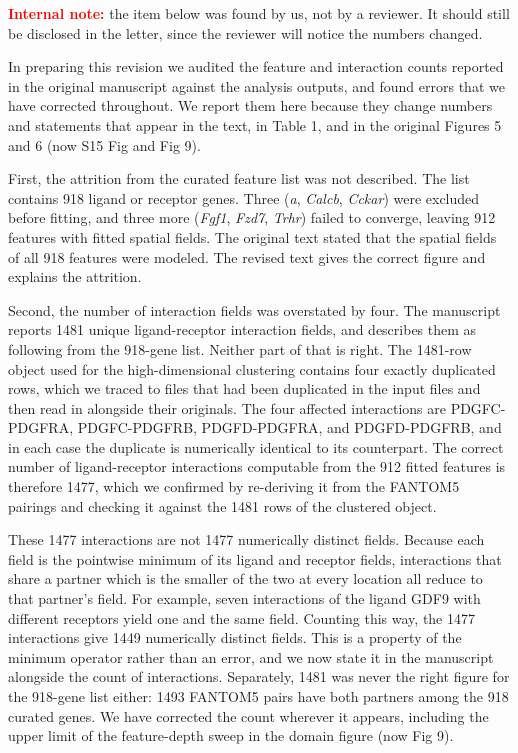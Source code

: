 \documentclass[11pt]{article}
\newif\ifdraftmode\draftmodetrue
\begin{document}
\ifdraftmode
\noindent\textcolor{red}{\textbf{Internal note:}} the item below was found by us, not by a
reviewer. It should still be disclosed in the letter, since the reviewer will notice the
numbers changed.
\medskip
\fi

\noindent In preparing this revision we audited the feature and interaction counts reported
in the original manuscript against the analysis outputs, and found errors that we have
corrected throughout. We report them here because they change numbers and statements that
appear in the text, in Table 1, and in the original Figures 5 and 6 (now S15 Fig and Fig 9).

First, the attrition from the curated feature list was not described. The list contains 918
ligand or receptor genes. Three (\emph{a}, \emph{Calcb}, \emph{Cckar}) were excluded before
fitting, and three more (\emph{Fgf1}, \emph{Fzd7}, \emph{Trhr}) failed to converge, leaving
912 features with fitted spatial fields. The original text stated that the spatial fields of
all 918 features were modeled. The revised text gives the correct figure and explains the
attrition.

Second, the number of interaction fields was overstated by four. The manuscript reports 1481
unique ligand-receptor interaction fields, and describes them as following from the 918-gene
list. Neither part of that is right. The 1481-row object used for the high-dimensional
clustering contains four exactly duplicated rows, which we traced to files that had been
duplicated in the input files and then read in alongside their originals. The four affected interactions are PDGFC-PDGFRA, PDGFC-PDGFRB, PDGFD-PDGFRA, and
PDGFD-PDGFRB, and in each case the duplicate is numerically identical to its counterpart. The
correct number of ligand-receptor interactions computable from the 912 fitted features is
therefore 1477, which we confirmed by re-deriving it from the FANTOM5 pairings and checking
it against the 1481 rows of the clustered object.

These 1477 interactions are not 1477 numerically distinct fields. Because each field is the
pointwise minimum of its ligand and receptor fields, interactions that share a partner which is
the smaller of the two at every location all reduce to that partner's field. For example,
seven interactions of the ligand GDF9 with different receptors yield one and the same field.
Counting this way, the 1477 interactions give 1449 numerically distinct fields. This is a
property of the minimum operator rather than an error, and we now state it in the manuscript
alongside the count of interactions. Separately, 1481 was never the right figure
for the 918-gene list either: 1493 FANTOM5 pairs have both partners among the 918 curated
genes. We have corrected the count wherever it appears, including the upper limit of the
feature-depth sweep in the domain figure (now Fig 9).
\end{document}
